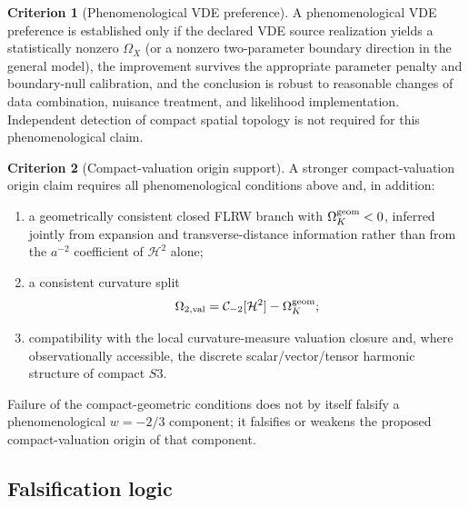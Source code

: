 \documentclass[11pt,a4paper]{article}
\def\Sthree{S3}%
\numberwithin{equation}{section}
\theoremstyle{definition}
\newtheorem{criterion}{Criterion}
\theoremstyle{plain}
\theoremstyle{remark}
\newcommand{\Sthree}{S^3}
\begin{document}
\begin{criterion}[Phenomenological VDE preference]
A phenomenological VDE preference is established only if the declared VDE source realization yields a statistically nonzero \(\Omega_X\) (or a nonzero two-parameter boundary direction in the general model), the improvement survives the appropriate parameter penalty and boundary-null calibration, and the conclusion is robust to reasonable changes of data combination, nuisance treatment, and likelihood implementation. Independent detection of compact spatial topology is not required for this phenomenological claim.
\end{criterion}

\begin{criterion}[Compact-valuation origin support]
A stronger compact-valuation origin claim requires all phenomenological conditions above and, in addition:
\begin{enumerate}
\item a geometrically consistent closed FLRW branch with \(\Omega_K^{\rm geom}<0\), inferred jointly from expansion and transverse-distance information rather than from the \(a^{-2}\) coefficient of \(\mathcal H^2\) alone;
\item a consistent curvature split
\begin{equation}
\Omega_{2,\rm val}=\mathcal C_{-2}[\mathcal H^2]-\Omega_K^{\rm geom};
\end{equation}
\item compatibility with the local curvature-measure valuation closure and, where observationally accessible, the discrete scalar/vector/tensor harmonic structure of compact \(\Sthree\).
\end{enumerate}
Failure of the compact-geometric conditions does not by itself falsify a phenomenological \(w=-2/3\) component; it falsifies or weakens the proposed compact-valuation origin of that component.
\end{criterion}

\subsection{Falsification logic}
\end{document}
